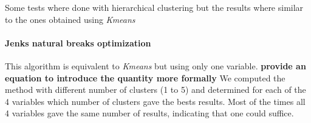Some tests where done with hierarchical clustering but the results where similar to the ones obtained using \emph{Kmeans}

\paragraph{Jenks natural breaks optimization}

This algorithm is equivalent to \emph{Kmeans} but using only one variable.
{\bf provide an equation to introduce the quantity more formally}
We computed the method with different number of clusters (1 to 5) and determined for each of the 4 variables which number of clusters gave the bests results. Most of the times all 4 variables gave the same number of results, indicating that one could suffice.